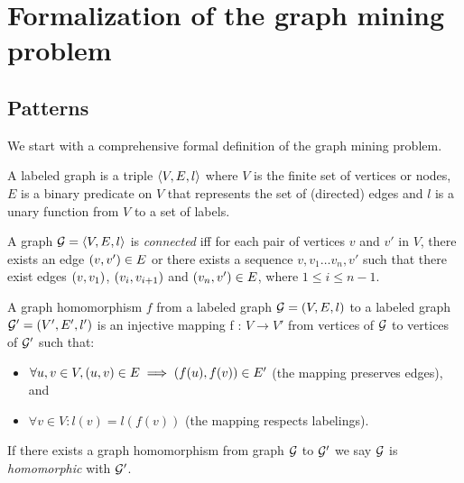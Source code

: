 \section{Formalization of the graph mining problem}\label{sec:formalization}

\subsection{Patterns}
We start with a comprehensive formal definition of the graph mining problem.

\begin{definition}
A labeled graph  is a triple $\langle V,E,l \rangle$ where $V$ is the finite set of vertices or nodes, $E$ is a binary predicate on $V$ that represents the set of (directed) edges and $l$ is a unary function from $V$ to a set of labels.
\end{definition}


\begin{definition}
A graph $\mathcal{G} = \langle V,E,l \rangle$ is \emph{connected} iff for each pair of vertices $v$ and $v'$ in $V$, there exists an edge $\left(v,v'\right) \in E$ or there exists a sequence $v, v_{1} \ldots v_{n}, v'$ such that there exist edges $\left(v,v_{1}\right)$, $\left(v_{i},v_{i+1}\right)$ and $\left(v_{n},v'\right) \in E$, where $1 \leq i \leq n-1$.
\end{definition}


\begin{definition}
A graph homomorphism $f$ from a labeled graph $\mathcal{G} = (V,E,l)$ to a labeled graph $\mathcal{G}' = (V',E',l')$ is an injective mapping f : $V \rightarrow V'$ from vertices of $\mathcal{G}$ to vertices of $\mathcal{G'}$ such that:
\begin{itemize}
\item $\forall u,v \in V, \left(u,v\right) \in E \implies \left(f(u),f(v)\right) \in E'$ (the mapping preserves edges), and 
\item $\forall v \in V : l(v) = l(f(v))$ (the mapping respects labelings).
\end{itemize}
If there exists a graph homomorphism from graph $\mathcal{G}$ to $\mathcal{G'}$ we say $\mathcal{G}$ is \emph{homomorphic} with $\mathcal{G'}$.
\end{definition}

